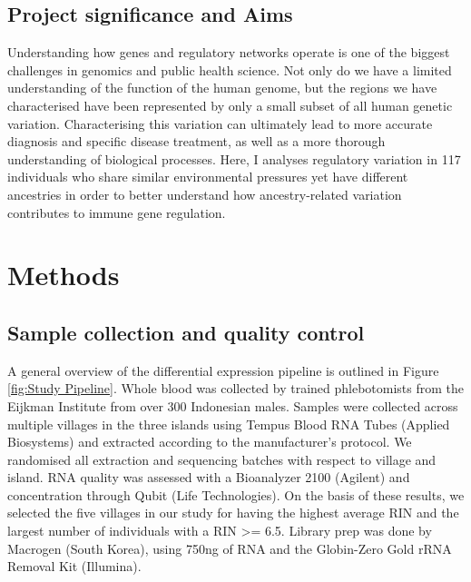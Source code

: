 \documentclass[12pt,a4paper,titlepage,twoside,openright]{book}
\begin{document}
\begin{mainmatter}
\section{Project significance and Aims}
Understanding how genes and regulatory networks operate is one of the biggest challenges in genomics and public health science. Not only do we have a limited understanding of the function of the human genome, but the regions we have characterised have been represented by only a small subset of all human genetic variation. Characterising this variation can ultimately lead to more accurate diagnosis and specific disease treatment, as well as a more thorough understanding of biological processes. Here, I analyses regulatory variation in 117 individuals who share similar environmental pressures yet have different ancestries in order to better understand how ancestry-related variation contributes to immune gene regulation.

\chapter{Methods}\label{}
\section{Sample collection and quality control}
A general overview of the differential expression pipeline is outlined in Figure \ref{fig:Study Pipeline}. Whole blood was collected by trained phlebotomists from the Eijkman Institute from over 300 Indonesian males. Samples were collected across multiple villages in the three islands using Tempus Blood RNA Tubes (Applied Biosystems) and extracted according to the manufacturer's protocol. We randomised all extraction and sequencing batches with respect to village and island. RNA quality was assessed with a Bioanalyzer 2100 (Agilent) and concentration through Qubit (Life Technologies). On the basis of these results, we selected the five villages in our study for having the highest average RIN and the largest number of individuals with a RIN >= 6.5. Library prep was done by Macrogen (South Korea), using 750ng of RNA and the Globin-Zero Gold rRNA Removal Kit (Illumina). 


\end{mainmatter}
\end{document}
